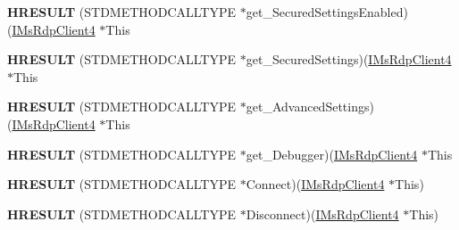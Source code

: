 \begin{DoxyCompactItemize}
\item 
\mbox{\label{struct_m_s_t_s_c_lib_1_1_i_ms_rdp_client4_vtbl_a50ea32895dd9d562c3c48ac382549f0f}} 
{\bfseries H\+R\+E\+S\+U\+LT} (S\+T\+D\+M\+E\+T\+H\+O\+D\+C\+A\+L\+L\+T\+Y\+PE $\ast$get\+\_\+\+Secured\+Settings\+Enabled)(\hyperlink{interface_m_s_t_s_c_lib_1_1_i_ms_rdp_client4}{I\+Ms\+Rdp\+Client4} $\ast$This
\item 
\mbox{\label{struct_m_s_t_s_c_lib_1_1_i_ms_rdp_client4_vtbl_a438d0fcbf7b4a780c1e76da8bf125fef}} 
{\bfseries H\+R\+E\+S\+U\+LT} (S\+T\+D\+M\+E\+T\+H\+O\+D\+C\+A\+L\+L\+T\+Y\+PE $\ast$get\+\_\+\+Secured\+Settings)(\hyperlink{interface_m_s_t_s_c_lib_1_1_i_ms_rdp_client4}{I\+Ms\+Rdp\+Client4} $\ast$This
\item 
\mbox{\label{struct_m_s_t_s_c_lib_1_1_i_ms_rdp_client4_vtbl_afce034868d1a0dcf446495b1949ddbc0}} 
{\bfseries H\+R\+E\+S\+U\+LT} (S\+T\+D\+M\+E\+T\+H\+O\+D\+C\+A\+L\+L\+T\+Y\+PE $\ast$get\+\_\+\+Advanced\+Settings)(\hyperlink{interface_m_s_t_s_c_lib_1_1_i_ms_rdp_client4}{I\+Ms\+Rdp\+Client4} $\ast$This
\item 
\mbox{\label{struct_m_s_t_s_c_lib_1_1_i_ms_rdp_client4_vtbl_ad3faf04fb7dc29339e06d0bb6df7c87f}} 
{\bfseries H\+R\+E\+S\+U\+LT} (S\+T\+D\+M\+E\+T\+H\+O\+D\+C\+A\+L\+L\+T\+Y\+PE $\ast$get\+\_\+\+Debugger)(\hyperlink{interface_m_s_t_s_c_lib_1_1_i_ms_rdp_client4}{I\+Ms\+Rdp\+Client4} $\ast$This
\item 
\mbox{\label{struct_m_s_t_s_c_lib_1_1_i_ms_rdp_client4_vtbl_a08b4df5842a99e7f9bd4bd7dffeca9f0}} 
{\bfseries H\+R\+E\+S\+U\+LT} (S\+T\+D\+M\+E\+T\+H\+O\+D\+C\+A\+L\+L\+T\+Y\+PE $\ast$Connect)(\hyperlink{interface_m_s_t_s_c_lib_1_1_i_ms_rdp_client4}{I\+Ms\+Rdp\+Client4} $\ast$This)
\item 
\mbox{\label{struct_m_s_t_s_c_lib_1_1_i_ms_rdp_client4_vtbl_ae7d973567bcd0108d211c8ad6463cb34}} 
{\bfseries H\+R\+E\+S\+U\+LT} (S\+T\+D\+M\+E\+T\+H\+O\+D\+C\+A\+L\+L\+T\+Y\+PE $\ast$Disconnect)(\hyperlink{interface_m_s_t_s_c_lib_1_1_i_ms_rdp_client4}{I\+Ms\+Rdp\+Client4} $\ast$This)

\end{DoxyCompactItemize}
